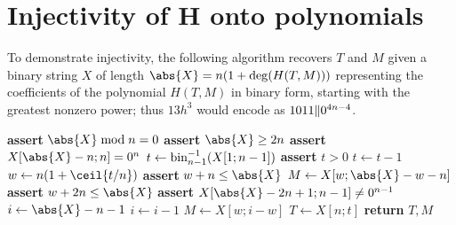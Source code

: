 \documentclass[hctr.tex]{subfiles}
\begin{document}
\section{Injectivity of H onto polynomials}\label{injective}
To demonstrate injectivity, 
the following algorithm recovers \(T\) and \(M\) given
a binary string \(X\) of length \(\abs{X} = n (1 + \deg(H(T, M)))\)
representing the coefficients of 
the polynomial \(H(T, M)\) in binary form,
starting with the greatest nonzero power; thus
\(13h^3\) would encode as \(1011 \Vert 0^{4n -4}\).
\begin{algorithmic}[1]
    \State \textbf{assert} \(\abs{X} \bmod n = 0\)
    \State \textbf{assert} \(\abs{X} \geq 2n\)
    \State \textbf{assert} \(X[\abs{X} - n; n] = 0^n\)
    \State \(t \gets \operatorname{bin}^{-1}_{n-1}(X[1;n-1])\)
    \State \textbf{assert} \(t > 0\)
    \State \(t \gets t-1\)
    \State \(w \gets n(1 + \ceil{t/n})\)
        \State \textbf{assert} \(w + n \leq \abs{X}\)
        \State \(M \gets X[w;\abs{X}-w-n]\)
    \Else
        \State \textbf{assert} \(w + 2n \leq \abs{X}\)
        \State \textbf{assert} \(X[\abs{X}-2n+1; n-1] \neq 0^{n-1}\)
        \State \(i \gets \abs{X} - n - 1\)
            \State \(i \gets i - 1\)
        \EndWhile
        \State \(M \gets X[w;i - w]\)
    \EndIf
    \State \(T \gets X[n;t]\)
    \State \textbf{return} \(T, M\)
    \EndProcedure
\end{algorithmic}
\end{document}

